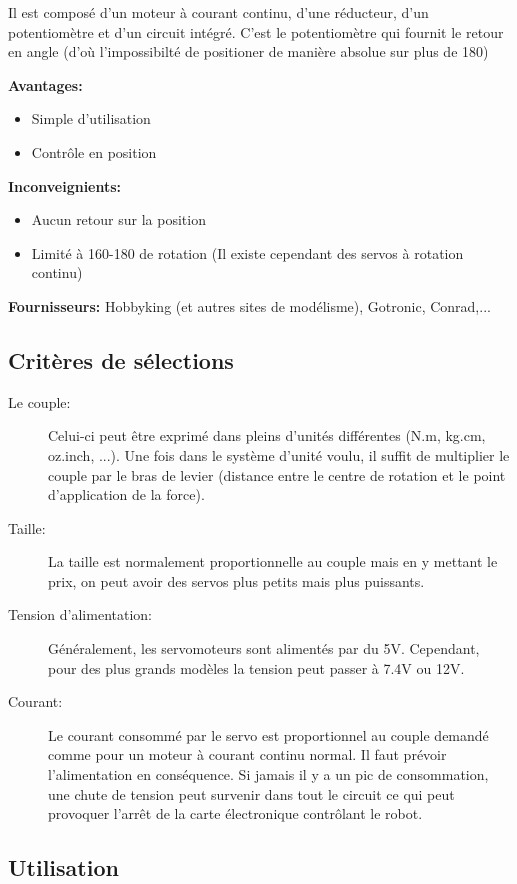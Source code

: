 \documentclass[a4paper, 11pt]{report}
\begin{document}
Il est composé d'un moteur à courant continu, d'une réducteur, d'un potentiomètre et d'un circuit intégré. C'est le potentiomètre qui fournit le retour en angle (d'où l'impossibilté de positioner de manière absolue sur plus de 180\degre)

\textbf{Avantages:}
\begin{itemize}
\item Simple d'utilisation
\item Contrôle en position
\end{itemize}

\textbf{Inconveignients:}
\begin{itemize}
\item Aucun retour sur la position
\item Limité à 160-180 \degre de rotation (Il existe cependant des servos à rotation continu)
\end{itemize}

\textbf{Fournisseurs:} Hobbyking (et autres sites de modélisme), Gotronic, Conrad,...

\subsection{Critères de sélections}
\begin{description}
\item[Le couple:]Celui-ci peut être exprimé dans pleins d'unités différentes (N.m, kg.cm, oz.inch, ...). Une fois dans le système d'unité voulu, il suffit de multiplier le couple par le bras de levier (distance entre le centre de rotation et le point d'application de la force).
\item[Taille:]La taille est normalement proportionnelle au couple mais en y mettant le prix, on peut avoir des servos plus petits mais plus puissants.
\item[Tension d'alimentation:]Généralement, les servomoteurs sont alimentés par du 5V. Cependant, pour des plus grands modèles la tension peut passer à 7.4V ou 12V.
\item[Courant:]Le courant consommé par le servo est proportionnel au couple demandé comme pour un moteur à courant continu normal. Il faut prévoir l'alimentation en conséquence. Si jamais il y a un pic de consommation, une chute de tension peut survenir dans tout le circuit ce qui peut provoquer l'arrêt de la carte électronique contrôlant le robot.
\end{description}


\subsection{Utilisation}
\end{document}
